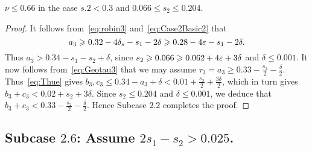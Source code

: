 \begin{lemma}\label{lem:Subcase2.5}
  \leanok
  $\nu \leq 0.66$ in the case $s.2 < 0.3$ and $0.066\leq s_2\leq 0.204$.
\end{lemma}
\begin{proof}
  It follows from~\eqref{eq:robin3} and~\eqref{eq:Case2Basic2} that
  \[
  a_3 \geqslant 0.32-4\delta_s-s_1 -2\delta \geqslant 0.28-4\varepsilon-s_1 -2\delta.
  \]
  Thus
  $a_3>0.34-s_1-s_2 +\delta$, since $s_2\geqslant 0.066 \geqslant 0.062+4\varepsilon +3\delta$ and $\delta\leq 0.001$.
  It now follows from~\eqref{eq:Geotau3} that we may assume $\tau_3=a_3 \geq 0.33
  -\frac{s_2}{2}-
  \frac{\delta}{2}$.
  Thus~\eqref{eq:Thue} gives
  $b_3,c_3 \le 0.34-a_3 +\delta< 0.01 +\frac{s_2}{2}+ \frac{3\delta}{2}$, which in turn gives
  $b_3+c_3 < 0.02+s_2 +3\delta$.
  Since $s_2\leq 0.204$ and $\delta\leq 0.001$, we deduce that
  $b_3+c_3<0.33-\frac{s_2}{2}-\frac{\delta}{2}$. Hence
  Subcase $\mathbf{2.2}$ completes the proof.
\end{proof}


\subsection*{Subcase $\mathbf{2.6}$: Assume $2s_1-s_2>0.025$.}

